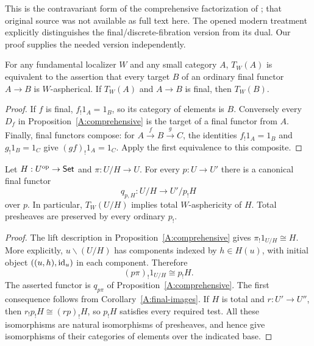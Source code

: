 This is the contravariant form of the comprehensive factorization of \citet[Theorem 3]{StreetWalters1973}; that original source was not available as full text here. The opened modern treatment \citep[Section 1.3, Theorem 1.7, and Remark 1.9]{BergerKaufmann2017} explicitly distinguishes the final/discrete-fibration version from its dual. Our proof supplies the needed version independently.

\begin{corollary}\label{A:final-images}
For any fundamental localizer $W$ and any small category $A$, $T_W(A)$ is equivalent to the assertion that every target $B$ of an ordinary final functor $A\to B$ is $W$-aspherical. If $T_W(A)$ and $A\to B$ is final, then $T_W(B)$.
\end{corollary}

\begin{proof}
If $f$ is final, $f_!1_A=1_B$, so its category of elements is $B$. Conversely every $D_f$ in Proposition~\ref{A:comprehensive} is the target of a final functor from $A$. Finally, final functors compose: for $A\xrightarrow{f}B\xrightarrow{g}C$, the identities $f_!1_A=1_B$ and $g_!1_B=1_C$ give $(gf)_!1_A=1_C$. Apply the first equivalence to this composite.
\end{proof}

\begin{proposition}\label{A:elements-Kan}
Let $H:U^{\mathrm{op}}\to\mathsf{Set}$ and $\pi:U/H\to U$. For every $p:U\to U'$ there is a canonical final functor
\[
 q_{p,H}:U/H\longrightarrow U'/p_!H
\]
over $p$. In particular, $T_W(U/H)$ implies total $W$-asphericity of $H$. Total presheaves are preserved by every ordinary $p_!$.
\end{proposition}

\begin{proof}
The lift description in Proposition~\ref{A:comprehensive} gives $\pi_!1_{U/H}\cong H$. More explicitly, $u\backslash(U/H)$ has components indexed by $h\in H(u)$, with initial object $((u,h),\mathrm{id}_u)$ in each component. Therefore
\[
 (p\pi)_!1_{U/H}\cong p_!H.
\]
The asserted functor is $q_{p\pi}$ of Proposition~\ref{A:comprehensive}. The first consequence follows from Corollary~\ref{A:final-images}. If $H$ is total and $r:U'\to U''$, then $r_!p_!H\cong(rp)_!H$, so $p_!H$ satisfies every required test. All these isomorphisms are natural isomorphisms of presheaves, and hence give isomorphisms of their categories of elements over the indicated base.
\end{proof}

